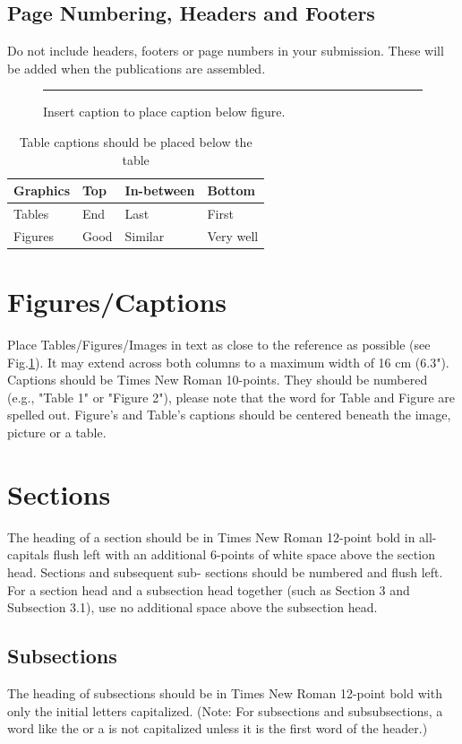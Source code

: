 \documentclass[twoside,twocolumn,10pt]{article}
\begin{document}
\subsection*{Page Numbering, Headers and Footers}
Do not include headers, footers or page numbers in your submission. These will be added when the publications are assembled.

\begin{figure}[htb]
    \centering
    \rule{6cm}{3cm}
    \caption{Insert caption to place caption below figure.}
    \label{fig:box}
\end{figure}

\begin{table}[htb]
	\centering
	\begin{tabular}{|l|l|l|l|}
	\hline
	Graphics & Top & In-between & Bottom \\
	\hline
	Tables & End & Last & First \\
	\hline
	Figures & Good & Similar & Very well \\
	\hline
	\end{tabular}
	\caption{Table captions should be placed below the table}
\end{table}

\section{Figures/Captions}
Place Tables/Figures/Images in text as close to the reference as possible (see Fig.\ref{fig:box}). It may extend across both columns to a maximum width of 16 cm (6.3"). Captions should be Times New Roman 10-points.  They should be numbered (e.g., "Table 1" or "Figure 2"), please note that the word for Table and Figure are spelled out. Figure's and Table's captions should be centered beneath the image, picture or a table.

\section{Sections}
The heading of a section should be in Times New Roman 12-point bold in all-capitals flush left with an additional 6-points of white space above the section head.  Sections and subsequent sub- sections should be numbered and flush left. For a section head and a subsection head together (such as Section 3 and Subsection 3.1), use no additional space above the subsection head.

\subsection{Subsections}
The heading of subsections should be in Times New Roman 12-point bold with only the initial letters capitalized. (Note: For subsections and subsubsections, a word like the or a is not capitalized unless it is the first word of the header.)
\end{document}
